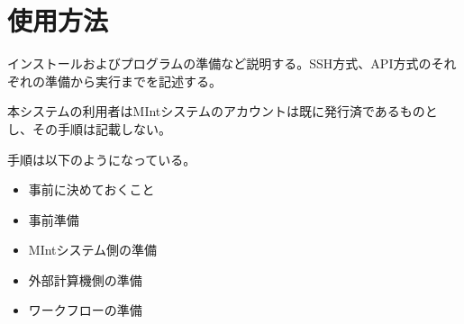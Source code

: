 \documentclass[letterpaper,10pt,dvipdfmx,openany]{sphinxmanual}
\begin{document}
\chapter{使用方法}
\label{\detokenize{using_distributed_properties:id24}}
インストールおよびプログラムの準備など説明する。SSH方式、API方式のそれぞれの準備から実行までを記述する。

本システムの利用者はMIntシステムのアカウントは既に発行済であるものとし、その手順は記載しない。

手順は以下のようになっている。
\begin{itemize}
\item {} 
事前に決めておくこと

\item {} 
事前準備

\item {} 
MIntシステム側の準備

\item {} 
外部計算機側の準備

\item {} 
ワークフローの準備

\end{itemize}
\end{document}
